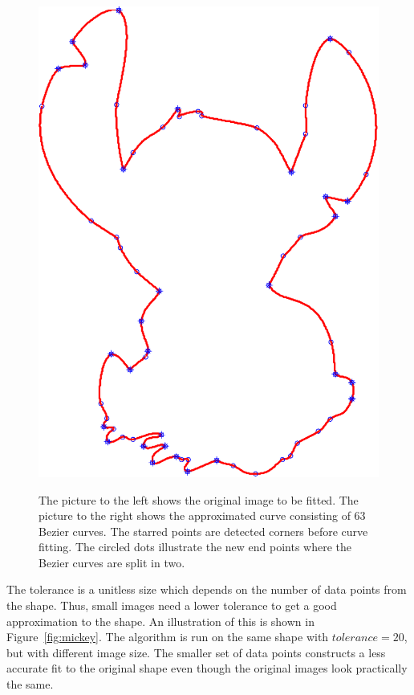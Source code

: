\documentclass[10pt]{article}
\begin{document}
\begin{figure}
\begin{minipage}[t]{.5\textwidth}
    \includegraphics[scale=0.45]{figure5-crop.pdf}
    \label{fig:cornerdet}
\end{minipage}\hfill
\caption{The picture to the left shows the original image to be fitted. The picture to the right shows the approximated curve consisting of 63 Bezier curves. The starred points are detected corners before curve fitting. The circled dots illustrate the new end points where the Bezier curves are split in two.}
\label{fig:stitch}
\end{figure}

The tolerance is a unitless size which depends on the number of data points from the shape. Thus, small images need a lower tolerance to get a good approximation to the shape.  An illustration of this is shown in Figure~\ref{fig:mickey}. The algorithm is run on the same shape with $tolerance = 20$, but with different image size. The smaller set of data points constructs a less accurate fit to the original shape even though the original images look practically the same. 
\end{document}
